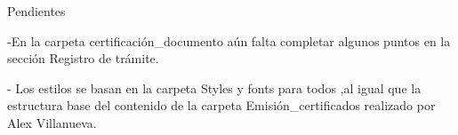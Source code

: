 Pendientes

-En la carpeta certificación_documento aún falta completar algunos 
 puntos en la sección Registro de trámite.

-  Los estilos se basan en la carpeta Styles y fonts para todos  ,al igual que la 
  estructura base del contenido de la carpeta Emisión_certificados realizado por Alex Villanueva.

 